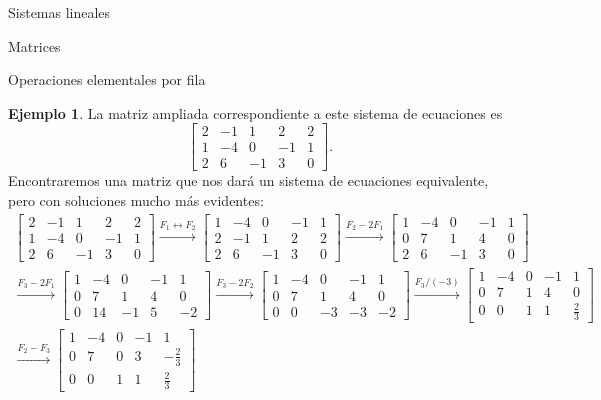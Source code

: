 \documentclass[a4paper,12pt,twoside,spanish]{amsbook}
\theoremstyle{definition}
\newtheorem{ejemplo}{Ejemplo}[section]
\theoremstyle{remark}
\begin{document}
\begin{chapter}{Sistemas lineales}
\begin{section}{Matrices}
\begin{subsection}{Operaciones elementales por fila}
\begin{ejemplo}
					
					La matriz ampliada  correspondiente a este sistema de ecuaciones es 
					$$
					\left[\begin{array}{cccc|c} 
					 2& -1&1& 2&2 \\ 1&-4 &0&-1&1 \\ 2&6&-1&3&0 \end{array}\right].
					$$
					Encontraremos una matriz que nos dará un sistema de ecuaciones equivalente, pero con soluciones mucho más evidentes:
					\begin{multline*}
					\left[\begin{array}{cccc|c}  2& -1&1& 2&2 \\ 1&-4 &0&-1&1 \\ 2&6&-1&3&0 \end{array}\right]
					\stackrel{F_1\leftrightarrow F_2}{\longrightarrow} 
					\left[\begin{array}{cccc|c}  1&-4 &0&-1&1 \\ 2& -1&1& 2&2 \\ 2&6&-1&3&0 \end{array}\right]
					\stackrel{F_2-2 F_1}{\longrightarrow} 
					\left[\begin{array}{cccc|c}  1&-4 &0&-1&1 \\ 0& 7&1& 4&0 \\ 2&6&-1&3&0 \end{array}\right]
					\\
					\stackrel{F_3-2 F_1}{\longrightarrow} 
					\left[\begin{array}{cccc|c}  1&-4 &0&-1&1 \\ 0& 7&1& 4&0 \\ 0&14&-1&5&-2 \end{array}\right] 
					\stackrel{F_3-2 F_2}{\longrightarrow} 
					\left[\begin{array}{cccc|c}  1&-4 &0&-1&1 \\ 0& 7&1& 4&0 \\ 0&0&-3&-3&-2 \end{array}\right] 
					\stackrel{F_3/(-3)}{\longrightarrow} 
					\left[\begin{array}{cccc|c}  1&-4 &0&-1&1 \\ 0& 7&1& 4&0 \\ 0&0&1&1&\frac{2}{3} \end{array}\right]
					\\
					\stackrel{F_2- F_3}{\longrightarrow} 
					\left[\begin{array}{cccc|c}  1&-4 &0&-1&1 \\ 0& 7&0& 3&-\frac{2}{3} \\ 0&0&1&1&\frac{2}{3} \end{array}\right]

\end{multline*}
\end{ejemplo}
\end{subsection}
\end{section}
\end{chapter}
\end{document}
